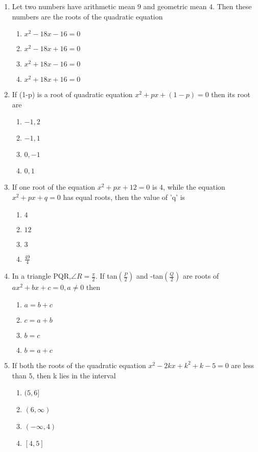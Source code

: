 \begin{enumerate}[label=\arabic*.,ref=\thesubsection.\theenumi]
\item Let two numbers have arithmetic mean $9$ and geometric mean $4$. Then these numbers are the roots of the quadratic equation
\begin{enumerate}
\item $x^2-18x-16=0$
\item $x^2-18x+16=0$ 
\item $x^2+18x-16=0$
\item $x^2+18x+16=0$ 
\end{enumerate}
 
\item If (1-p) is a root of quadratic equation $x^2+px+(1-p)=0$ then its root are
\begin{enumerate}
\item $-1,2$
\item $-1,1$
\item $0,-1$
\item $0,1$
\end{enumerate}

\item If one root of the equation $x^2+px+12=0$ is $4$, while the equation $x^2+px+q=0$ has equal roots, then the value of 'q' is
\begin{enumerate}
\item $4$
\item $12$ 
\item $3$
\item $\frac{49}{4}$ 
\end{enumerate}

\item In a triangle PQR,$\angle{R}=\frac{\pi}{2}$. If tan$(\frac{P}{2})$ and -tan$(\frac{Q}{2})$ are roots of $ax^2+bx+c=0, a\neq0$ then
\begin{enumerate}
\item $a=b+c$
\item $c=a+b$
\item $b=c$
\item $b=a+c$ 
\end{enumerate}

\item If both the roots of the quadratic equation $x^2-2kx+k^2+k-5=0$ are less than $5$, then k lies in the interval
\begin{enumerate}
\item $(5,6]$
\item $(6,\infty)$
\item $(-\infty, 4)$
\item $[4,5]$ 
\end{enumerate}


\end{enumerate}
